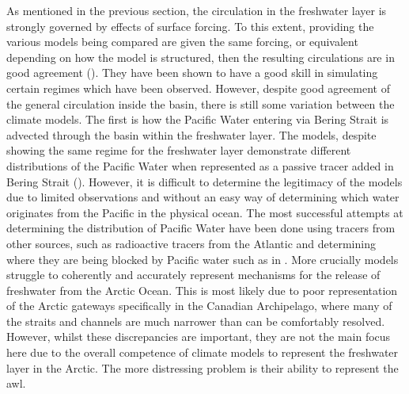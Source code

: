 \documentclass[12pt,a4paper]{report}
\begin{document}
As mentioned in the previous section, the circulation in the freshwater layer is strongly
 governed by effects of surface forcing. To this extent, providing the various models being
  compared are given the same forcing, or equivalent depending on how the model is
   structured, then the resulting circulations are in good agreement
    (\cite{proshutinsky2005arctic}). They have been shown to have a good skill in simulating
     certain regimes which have been observed. However, despite good agreement of the general
      circulation inside the basin, there is still some variation between the climate models.
       The first is how the Pacific Water entering via Bering Strait is advected through the
    basin within the freshwater layer. The models, despite showing the same regime for the
     freshwater layer demonstrate different distributions of the Pacific Water when
      represented as a passive tracer added in Bering Strait (\cite{proshutinsky2011recent}).
       However, it is difficult to
       determine the legitimacy of the models
       due to limited observations and without an easy way of determining which water originates from the Pacific in the physical ocean. The
     most successful attempts at determining the distribution of Pacific Water have been
     done using tracers from other sources, such as radioactive tracers from the Atlantic and
      determining where they are being blocked by Pacific water such as in \cite{karcher2004dispersion}. More crucially models struggle to coherently and accurately represent
    mechanisms for the release of freshwater from the Arctic Ocean. This is most likely
     due to poor representation of the Arctic gateways specifically in the Canadian
      Archipelago, where many of the straits and channels are much narrower than can be
   comfortably resolved. However, whilst these discrepancies are important, they are
    not the main focus here due to the overall competence of climate models to
 represent the freshwater layer in the Arctic. The more distressing problem is
  their ability to represent the \gls{awl}. 
\end{document}
